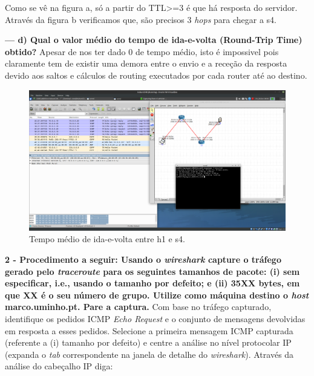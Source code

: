 \documentclass[a4paper]{article}
\begin{document}
Como se vê na figura a, só a partir do TTL\textgreater=3 é que há resposta do servidor. Através da figura b verificamos que, são precisos 3 \textit{hops} para chegar a s4.

\vspace{1cm}

\textbf{--- d) Qual o valor médio do tempo de ida-e-volta (Round-Trip Time) obtido?}\newline
Apesar de nos ter dado 0 de tempo médio, isto é impossivel pois claramente tem de existir uma demora entre o envio e a receção da resposta devido aos saltos e cálculos de routing executados por cada router até ao destino.
\begin{figure}[ht]
    \centering
    \includegraphics[scale=0.15]{pic5.png}
    \caption{Tempo médio de ida-e-volta entre h1 e s4.}

\end{figure}


\newpage


\textbf{2 - Procedimento a seguir:\newline
Usando o \textit{wireshark} capture o tráfego gerado pelo \textit{traceroute} para os seguintes tamanhos de pacote: (i) sem especificar, i.e., usando o tamanho por defeito; e (ii) 35XX bytes, em que XX é o seu número de grupo. Utilize como máquina destino o \textit{host} marco.uminho.pt. Pare a captura.}\newline
Com base no tráfego capturado, identifique os pedidos ICMP \textit{Echo Request} e o conjunto de mensagens devolvidas em resposta a esses pedidos.\newline
Selecione a primeira mensagem ICMP capturada (referente a (i) tamanho por defeito) e centre a análise no nível protocolar IP (expanda o \textit{tab} correspondente na janela de detalhe do \textit{wireshark}). Através da análise do cabeçalho IP diga:\newline
\vspace{1cm}
\end{document}
